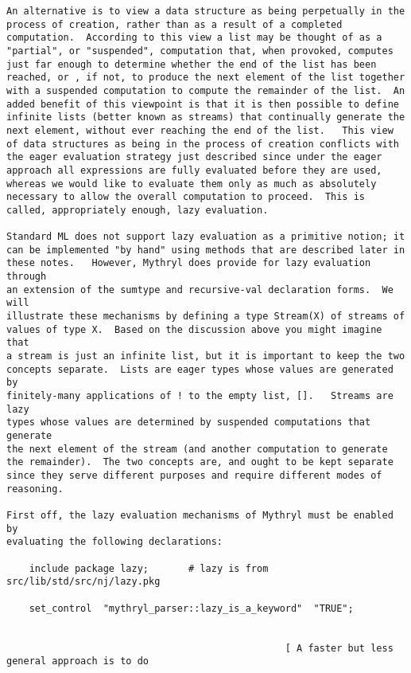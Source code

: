 \begin{verbatim}
An alternative is to view a data structure as being perpetually in the 
process of creation, rather than as a result of a completed 
computation.  According to this view a list may be thought of as a 
"partial", or "suspended", computation that, when provoked, computes 
just far enough to determine whether the end of the list has been 
reached, or , if not, to produce the next element of the list together 
with a suspended computation to compute the remainder of the list.  An 
added benefit of this viewpoint is that it is then possible to define 
infinite lists (better known as streams) that continually generate the 
next element, without ever reaching the end of the list.   This view 
of data structures as being in the process of creation conflicts with 
the eager evaluation strategy just described since under the eager 
approach all expressions are fully evaluated before they are used, 
whereas we would like to evaluate them only as much as absolutely 
necessary to allow the overall computation to proceed.  This is 
called, appropriately enough, lazy evaluation. 
 
Standard ML does not support lazy evaluation as a primitive notion; it 
can be implemented "by hand" using methods that are described later in 
these notes.   However, Mythryl does provide for lazy evaluation through 
an extension of the sumtype and recursive-val declaration forms.  We will 
illustrate these mechanisms by defining a type Stream(X) of streams of 
values of type X.  Based on the discussion above you might imagine that 
a stream is just an infinite list, but it is important to keep the two 
concepts separate.  Lists are eager types whose values are generated by 
finitely-many applications of ! to the empty list, [].   Streams are lazy 
types whose values are determined by suspended computations that generate 
the next element of the stream (and another computation to generate 
the remainder).  The two concepts are, and ought to be kept separate 
since they serve different purposes and require different modes of 
reasoning. 
 
First off, the lazy evaluation mechanisms of Mythryl must be enabled by 
evaluating the following declarations: 
 
    include package lazy;       # lazy is from   src/lib/std/src/nj/lazy.pkg  
 
    set_control  "mythryl_parser::lazy_is_a_keyword"  "TRUE"; 
 
 
                                                 [ A faster but less general approach is to do 
 

\end{verbatim}
